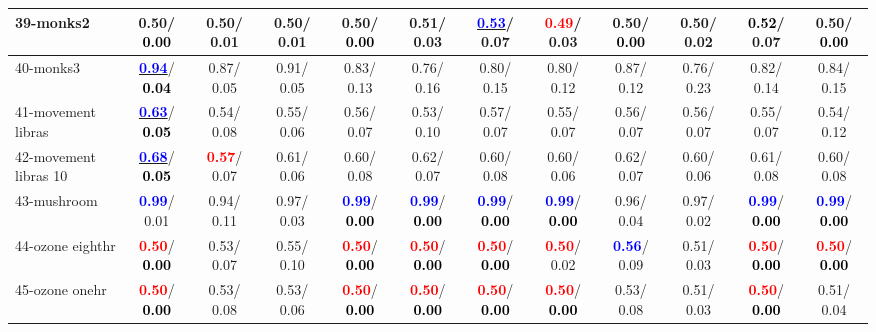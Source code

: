 \begin{table}[h]
\begin{center}
{\begin{tabular}{lc|c|c|c|c|c|c|c|c|c|c}
39-monks2 &   0.50/\textcolor{black}{\textbf{  0.00}} &   0.50/  0.01 &   0.50/  0.01 &   0.50/\textcolor{black}{\textbf{  0.00}} &   0.51/  0.03 & \underline{\textcolor{blue}{\textbf{  0.53}}}/  0.07 & \textcolor{red}{\textbf{  0.49}}/  0.03 &   0.50/\textcolor{black}{\textbf{  0.00}} &   0.50/  0.02 & \textcolor{black}{\textbf{  0.52}}/  0.07 &   0.50/\textcolor{black}{\textbf{  0.00}} \\ \hline
40-monks3 & \underline{\textcolor{blue}{\textbf{  0.94}}}/\textcolor{black}{\textbf{  0.04}} &   0.87/  0.05 &   0.91/  0.05 &   0.83/  0.13 &   0.76/  0.16 &   0.80/  0.15 &   0.80/  0.12 &   0.87/  0.12 &   0.76/  0.23 &   0.82/  0.14 &   0.84/  0.15 \\
41-movement libras & \underline{\textcolor{blue}{\textbf{  0.63}}}/\textcolor{black}{\textbf{  0.05}} &   0.54/  0.08 &   0.55/  0.06 &   0.56/  0.07 &   0.53/  0.10 &   0.57/  0.07 &   0.55/  0.07 &   0.56/  0.07 &   0.56/  0.07 &   0.55/  0.07 &   0.54/  0.12 \\
42-movement libras 10 & \underline{\textcolor{blue}{\textbf{  0.68}}}/\textcolor{black}{\textbf{  0.05}} & \textcolor{red}{\textbf{  0.57}}/  0.07 &   0.61/  0.06 &   0.60/  0.08 &   0.62/  0.07 &   0.60/  0.08 &   0.60/  0.06 &   0.62/  0.07 &   0.60/  0.06 &   0.61/  0.08 &   0.60/  0.08 \\
43-mushroom & \textcolor{blue}{\textbf{  0.99}}/  0.01 &   0.94/  0.11 &   0.97/  0.03 & \textcolor{blue}{\textbf{  0.99}}/\textcolor{black}{\textbf{  0.00}} & \textcolor{blue}{\textbf{  0.99}}/\textcolor{black}{\textbf{  0.00}} & \textcolor{blue}{\textbf{  0.99}}/\textcolor{black}{\textbf{  0.00}} & \textcolor{blue}{\textbf{  0.99}}/\textcolor{black}{\textbf{  0.00}} &   0.96/  0.04 &   0.97/  0.02 & \textcolor{blue}{\textbf{  0.99}}/\textcolor{black}{\textbf{  0.00}} & \textcolor{blue}{\textbf{  0.99}}/\textcolor{black}{\textbf{  0.00}} \\
44-ozone eighthr & \textcolor{red}{\textbf{  0.50}}/\textcolor{black}{\textbf{  0.00}} &   0.53/  0.07 &   0.55/  0.10 & \textcolor{red}{\textbf{  0.50}}/\textcolor{black}{\textbf{  0.00}} & \textcolor{red}{\textbf{  0.50}}/\textcolor{black}{\textbf{  0.00}} & \textcolor{red}{\textbf{  0.50}}/\textcolor{black}{\textbf{  0.00}} & \textcolor{red}{\textbf{  0.50}}/  0.02 & \textcolor{blue}{\textbf{  0.56}}/  0.09 &   0.51/  0.03 & \textcolor{red}{\textbf{  0.50}}/\textcolor{black}{\textbf{  0.00}} & \textcolor{red}{\textbf{  0.50}}/\textcolor{black}{\textbf{  0.00}} \\
45-ozone onehr & \textcolor{red}{\textbf{  0.50}}/\textcolor{black}{\textbf{  0.00}} &   0.53/  0.08 &   0.53/  0.06 & \textcolor{red}{\textbf{  0.50}}/\textcolor{black}{\textbf{  0.00}} & \textcolor{red}{\textbf{  0.50}}/\textcolor{black}{\textbf{  0.00}} & \textcolor{red}{\textbf{  0.50}}/\textcolor{black}{\textbf{  0.00}} & \textcolor{red}{\textbf{  0.50}}/\textcolor{black}{\textbf{  0.00}} &   0.53/  0.08 &   0.51/  0.03 & \textcolor{red}{\textbf{  0.50}}/\textcolor{black}{\textbf{  0.00}} &   0.51/  0.04 \\

\end{tabular}}
\end{center}
\end{table}
